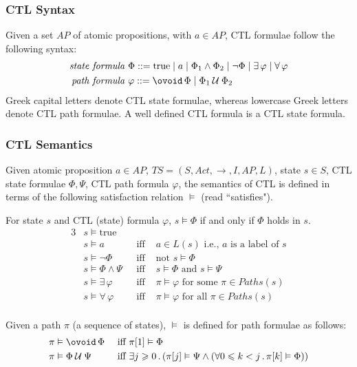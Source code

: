 \documentclass{article}
\begin{document}
\subsubsection*{CTL Syntax}
Given a set $AP$ of atomic propositions, with $a \in AP$, CTL formulae follow the following syntax: 
\begin{align*}
    \emph{state formula } & \Phi ::= \text{true} \mid a \mid \Phi_1 \land \Phi_2 \mid \neg \Phi \mid \exists \, \varphi \mid \forall \, \varphi \\
    \emph{path formula }  & \varphi ::= \lnext{\Phi} \mid \lluntil{\Phi_1}{\Phi_2} \\
\end{align*}
Greek capital letters denote CTL state formulae, whereas lowercase Greek letters denote CTL path formulae. 
A well defined CTL formula is a CTL state formula.

\subsubsection*{CTL Semantics}
Given atomic proposition $a \in AP$, $TS = (S, Act, \rightarrow, I, AP, L)$, state $s \in S$, 
CTL state formulae $\Phi, \Psi$, CTL path formula $\varphi$, 
the semantics of CTL is defined in terms of the following satisfaction relation $\vDash$ (read ``satisfies").

For state $s$ and CTL (state) formula $\varphi$, $s \vDash \Phi$ if and only if $\Phi$ holds in $s$.
\begin{alignat*}{3}
     & s \vDash \text{true} &  \\
     & s \vDash a & \text{ iff } & a \in L(s) \text{ i.e., $a$ is a label of $s$}\\ 
     & s \vDash \neg \Phi & \text{ iff } & \text{not } s \vDash \Phi \\
     & s \vDash \Phi \land \Psi \, \, & \text{ iff }&  s \vDash \Phi \text{ and } s \vDash \Psi \\
     & s \vDash \exists \, \varphi & \text{ iff } & \pi \vDash \varphi \text{ for some } \pi \in Paths(s) \\ 
     & s \vDash \forall \, \varphi & \text{ iff } & \pi \vDash \varphi \text{ for all } \pi \in Paths(s) \\ 
\end{alignat*}

Given a path $\pi$ (a sequence of states), $\vDash$ is defined for path formulae as follows: 
\begin{alignat*}{3}
    & \pi \vDash \lnext{\Phi} & \text{ iff     } & \pi[1]  \vDash \Phi \\ 
    & \pi \vDash \lluntil{\Phi}{\Psi} \, \, & \text{ iff    } & \exists j \geqslant 0 \, . \, (\pi[j]  \vDash \Psi \land (\forall 0 \leqslant k < j \, . \,  \pi[k]  \vDash \Phi))
\end{alignat*}
\end{document}
